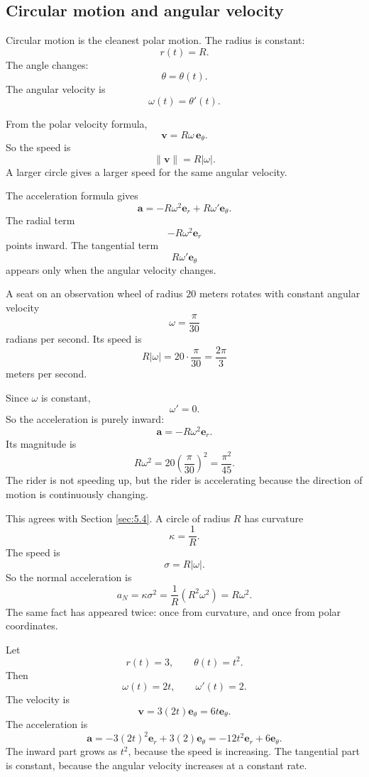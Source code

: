 \subsection{Circular motion and angular velocity}

Circular motion is the cleanest polar motion.  The radius is constant:
\[
    r(t)=R.
\]
The angle changes:
\[
    \theta=\theta(t).
\]
The angular velocity is
\[
\boxed{
    \omega(t)=\theta'(t).
}
\]

From the polar velocity formula,
\[
    \mathbf v=R\omega\,\mathbf e_\theta.
\]
So the speed is
\[
\boxed{
    \|\mathbf v\|=R|\omega|.
}
\]
A larger circle gives a larger speed for the same angular velocity.

The acceleration formula gives
\[
\boxed{
    \mathbf a=-R\omega^2\mathbf e_r+R\omega'\mathbf e_\theta.
}
\]
The radial term
\[
    -R\omega^2\mathbf e_r
\]
points inward.  The tangential term
\[
    R\omega'\mathbf e_\theta
\]
appears only when the angular velocity changes.

\begin{example}
A seat on an observation wheel of radius \(20\) meters rotates with constant angular
velocity
\[
    \omega=\frac{\pi}{30}
\]
radians per second.  Its speed is
\[
    R|\omega|
    =
    20\cdot\frac{\pi}{30}
    =
    \frac{2\pi}{3}
\]
meters per second.

Since \(\omega\) is constant,
\[
    \omega'=0.
\]
So the acceleration is purely inward:
\[
    \mathbf a=-R\omega^2\mathbf e_r.
\]
Its magnitude is
\[
    R\omega^2
    =
    20\left(\frac{\pi}{30}\right)^2
    =
    \frac{\pi^2}{45}.
\]
The rider is not speeding up, but the rider is accelerating because the direction of
motion is continuously changing.
\end{example}

This agrees with Section \ref{sec:5.4}.  A circle of radius \(R\) has curvature
\[
    \kappa=\frac1R.
\]
The speed is
\[
    \sigma=R|\omega|.
\]
So the normal acceleration is
\[
    a_N=\kappa\sigma^2
    =
    \frac1R(R^2\omega^2)
    =
    R\omega^2.
\]
The same fact has appeared twice: once from curvature, and once from polar
coordinates.

\begin{example}
Let
\[
    r(t)=3,
    \qquad
    \theta(t)=t^2.
\]
Then
\[
    \omega(t)=2t,
    \qquad
    \omega'(t)=2.
\]
The velocity is
\[
    \mathbf v=3(2t)\mathbf e_\theta=6t\mathbf e_\theta.
\]
The acceleration is
\[
    \mathbf a
    =
    -3(2t)^2\mathbf e_r+3(2)\mathbf e_\theta
    =
    -12t^2\mathbf e_r+6\mathbf e_\theta.
\]
The inward part grows as \(t^2\), because the speed is increasing.  The tangential part
is constant, because the angular velocity increases at a constant rate.
\end{example}

